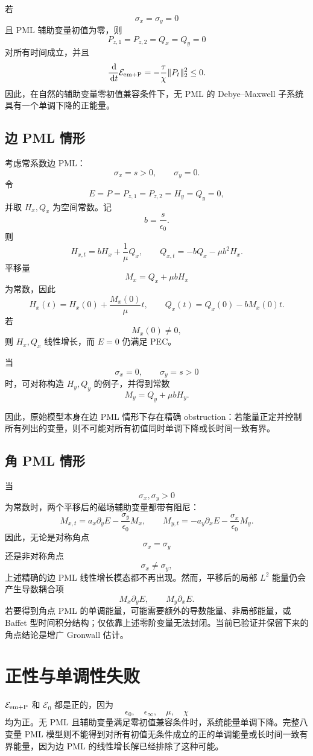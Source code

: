 \documentclass[UTF8,a4paper,12pt]{ctexart}
\newcommand{\dd}{\,\mathrm{d}}
\newcommand{\sx}{\sigma_x}
\newcommand{\sy}{\sigma_y}
\newcommand{\Ecal}{\mathcal E}
\begin{document}
若
\[
\sx=\sy=0
\]
且 PML 辅助变量初值为零，则
\[
P_{z,1}=P_{z,2}=Q_x=Q_y=0
\]
对所有时间成立，并且
\[
\frac{\dd}{\dd t}\Ecal_{\rm em+P}
=-\frac{\tau}{\chi}\|P_t\|_2^2\le0 .
\]
因此，在自然的辅助变量零初值兼容条件下，无 PML 的 Debye--Maxwell 子系统具有一个单调下降的正能量。

\subsection{边 PML 情形}

考虑常系数边 PML：
\[
\sx=s>0,\qquad \sy=0.
\]
令
\[
E=P=P_{z,1}=P_{z,2}=H_y=Q_y=0,
\]
并取 \(H_x,Q_x\) 为空间常数。记
\[
b=\frac{s}{\epsilon_0}.
\]
则
\[
H_{x,t}=bH_x+\frac1\mu Q_x,\qquad
Q_{x,t}=-bQ_x-\mu b^2H_x .
\]
平移量
\[
M_x=Q_x+\mu bH_x
\]
为常数，因此
\[
H_x(t)=H_x(0)+\frac{M_x(0)}{\mu}t,\qquad
Q_x(t)=Q_x(0)-bM_x(0)t .
\]
若
\[
M_x(0)\ne0,
\]
则 \(H_x,Q_x\) 线性增长，而 \(E=0\) 仍满足 PEC。

当
\[
\sx=0,\qquad \sy=s>0
\]
时，可对称构造 \(H_y,Q_y\) 的例子，并得到常数
\[
M_y=Q_y+\mu bH_y.
\]

因此，原始模型本身在边 PML 情形下存在精确 obstruction：若能量正定并控制所有列出的变量，则不可能对所有初值同时单调下降或长时间一致有界。

\subsection{角 PML 情形}

当
\[
\sx,\sy>0
\]
为常数时，两个平移后的磁场辅助变量都带有阻尼：
\[
M_{x,t}=a_x\partial_yE-\frac{\sy}{\epsilon_0}M_x,\qquad
M_{y,t}=-a_y\partial_xE-\frac{\sx}{\epsilon_0}M_y .
\]
因此，无论是对称角点
\[
\sx=\sy
\]
还是非对称角点
\[
\sx\ne\sy,
\]
上述精确的边 PML 线性增长模态都不再出现。然而，平移后的局部 \(L^2\) 能量仍会产生导数耦合项
\[
M_x\partial_yE,\qquad M_y\partial_xE.
\]
若要得到角点 PML 的单调能量，可能需要额外的导数能量、非局部能量，或 Baffet 型时间积分结构；仅依靠上述零阶变量无法封闭。当前已验证并保留下来的角点结论是增广 Gronwall 估计。

\section{正性与单调性失败}

\(\Ecal_{\rm em+P}\) 和 \(\Ecal_0\) 都是正的，因为
\[
\epsilon_0,\quad \epsilon_\infty,\quad \mu,\quad \chi
\]
均为正。无 PML 且辅助变量满足零初值兼容条件时，系统能量单调下降。完整八变量 PML 模型则不能得到对所有初值无条件成立的正的单调能量或长时间一致有界能量，因为边 PML 的线性增长解已经排除了这种可能。
\end{document}
